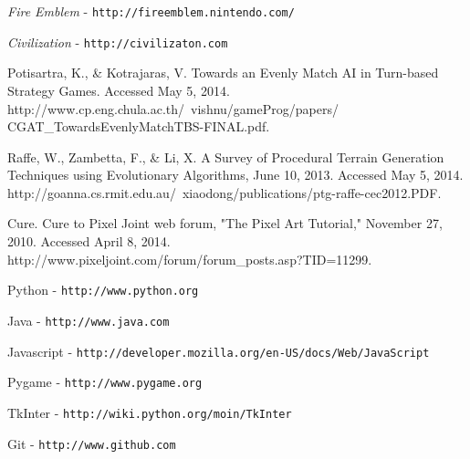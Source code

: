 \documentclass{article}
\begin{document}
\begin{thebibliography}{99}

\emph{Fire Emblem} - {\tt http://fireemblem.nintendo.com/}

\emph{Civilization} - {\tt http://civilizaton.com}

Potisartra, K., \& Kotrajaras, V. Towards an Evenly Match AI in Turn-based Strategy Games. Accessed May 5, 2014. http://www.cp.eng.chula.ac.th/~vishnu/gameProg/papers/ CGAT\_TowardsEvenlyMatchTBS-FINAL.pdf.

Raffe, W., Zambetta, F., \& Li, X. A Survey of Procedural Terrain Generation Techniques using Evolutionary Algorithms, June 10, 2013. Accessed May 5, 2014. http://goanna.cs.rmit.edu.au/~xiaodong/publications/ptg-raffe-cec2012.PDF.

Cure. Cure to Pixel Joint web forum, "The Pixel Art Tutorial," November 27, 2010. Accessed April 8, 2014. http://www.pixeljoint.com/forum/forum\_posts.asp?TID=11299. 


Python - {\tt http://www.python.org}

Java - {\tt http://www.java.com}

Javascript - {\tt http://developer.mozilla.org/en-US/docs/Web/JavaScript}

Pygame - {\tt http://www.pygame.org}

TkInter - {\tt http://wiki.python.org/moin/TkInter}

Git - {\tt http://www.github.com}

\end{thebibliography}
\end{document}
